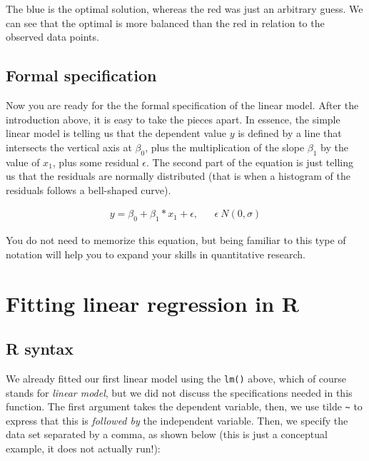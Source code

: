 \documentclass[
]{book}
\begin{document}
The blue is the optimal solution, whereas the red was just an arbitrary guess. We can see that the optimal is more balanced than the red in relation to the observed data points.

\hypertarget{formal-specification}{%
\subsection{Formal specification}\label{formal-specification}}

Now you are ready for the the formal specification of the linear model. After the introduction above, it is easy to take the pieces apart. In essence, the simple linear model is telling us that the dependent value \(y\) is defined by a line that intersects the vertical axis at \(\beta_0\), plus the multiplication of the slope \(\beta_1\) by the value of \(x_1\), plus some residual \(\epsilon\). The second part of the equation is just telling us that the residuals are normally distributed (that is when a histogram of the residuals follows a bell-shaped curve).

\[
\begin{align}
y = \beta_0 + \beta_1 * x_1 + \epsilon, && \epsilon ~ N(0, \sigma)  
\end{align}
\]

You do not need to memorize this equation, but being familiar to this type of notation will help you to expand your skills in quantitative research.

\hypertarget{fitting-linear-regression-in-r}{%
\section{Fitting linear regression in R}\label{fitting-linear-regression-in-r}}

\hypertarget{r-syntax}{%
\subsection{R syntax}\label{r-syntax}}

We already fitted our first linear model using the \texttt{lm()} above, which of course stands for \emph{linear model}, but we did not discuss the specifications needed in this function. The first argument takes the dependent variable, then, we use tilde \texttt{\textasciitilde{}} to express that this is \emph{followed by} the independent variable. Then, we specify the data set separated by a comma, as shown below (this is just a conceptual example, it does not actually run!):
\end{document}
